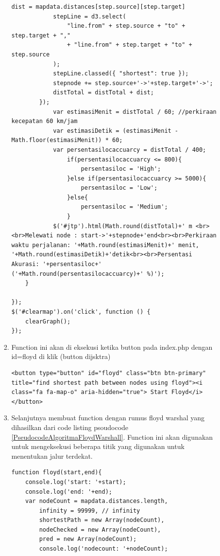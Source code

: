 \begin{enumerate}
\begin{enumerate}
\begin{enumerate}
\begin{lstlisting}[caption=Function OnClick Dijsktra]
            dist = mapdata.distances[step.source][step.target]
            stepLine = d3.select(
                "line.from" + step.source + "to" + step.target + ","
                + "line.from" + step.target + "to" + step.source
            );
            stepLine.classed({ "shortest": true });
            stepnode += step.source+'->'+step.target+'->';
            distTotal = distTotal + dist;
        });
            var estimasiMenit = distTotal / 60; //perkiraan kecepatan 60 km/jam
            var estimasiDetik = (estimasiMenit - Math.floor(estimasiMenit)) * 60;
            var persentasilocaccuarcy = distTotal / 400;
                if(persentasilocaccuarcy <= 800){
                    persentasiloc = 'High';
                }else if(persentasilocaccuarcy >= 5000){
                    persentasiloc = 'Low';
                }else{
                    persentasiloc = 'Medium';
                }
            $('#jtp').html(Math.round(distTotal)+' m <br><br>Melewati node : start->'+stepnode+'end<br><br>Perkiraan waktu perjalanan: '+Math.round(estimasiMenit)+' menit, '+Math.round(estimasiDetik)+'detik<br><br>Persentasi Akurasi: '+persentasiloc+' ('+Math.round(persentasilocaccuarcy)+' %)');
    }

});
$('#clearmap').on('click', function () {
    clearGraph();
});
\end{lstlisting}

    \item Function ini akan di eksekusi ketika button pada index.php dengan id=floyd di klik (button dijsktra)
\begin{lstlisting}[caption=Button Dijsktra]
<button type="button" id="floyd" class="btn btn-primary" title="find shortest path between nodes using floyd"><i class="fa fa-map-o" aria-hidden="true"> Start Floyd</i></button>
\end{lstlisting}

    \item Selanjutnya membuat function dengan rumus floyd warshal yang dihasilkan dari code listing psoudocode \ref{PseudocodeAlgoritmaFloydWarshall}. Function ini akan digunakan untuk mengeksekusi beberapa titik yang digunakan untuk menentukan jalur terdekat.
    
\begin{lstlisting}[caption=Function Algoritma Dijsktra]
function floyd(start,end){
    console.log('start: '+start);
    console.log('end: '+end);
    var nodeCount = mapdata.distances.length,
        infinity = 99999, // infinity
        shortestPath = new Array(nodeCount),
        nodeChecked = new Array(nodeCount),
        pred = new Array(nodeCount);
        console.log('nodecount: '+nodeCount);


\end{lstlisting}
\end{enumerate}
\end{enumerate}
\end{enumerate}
